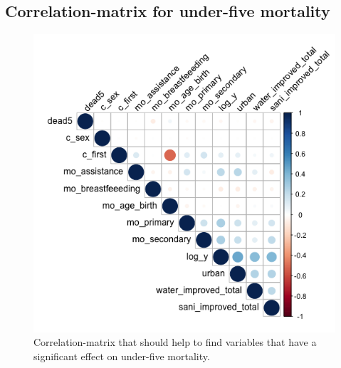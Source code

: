 \documentclass[a4paper, 11pt]{article} %
\begin{document}
\begin{appendices}
\newpage
\section{Correlation-matrix for under-five mortality} \label{sec:appendixd}
\begin{figure}[h!]
    \centering
    \includegraphics[scale=0.6]{figures/corrmatrix_dead5} 
    \caption{Correlation-matrix that should help to find variables that have a significant effect on under-five mortality.}
    \label{fig:corrmatrix_dead5}
\end{figure}

\end{appendices}
\end{document}

